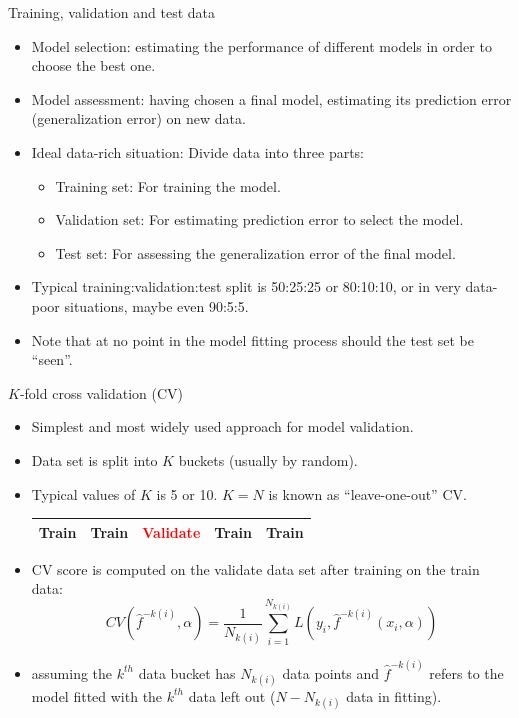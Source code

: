 \documentclass[aspectratio=169]{beamer}
\begin{document}
\begin{frame}{Training, validation and test data}
    \begin{itemize}
        \item Model selection: estimating the performance of different models in order to choose the best one.
        \item Model assessment: having chosen a final model, estimating its prediction error (generalization error) on new data.
        \item Ideal data-rich situation: Divide data into three parts:
        \begin{itemize}
            \item Training set: For training the model.
            \item Validation set: For estimating prediction error to select the model.
            \item Test set: For assessing the generalization error of the final model.
        \end{itemize}
        \item Typical training:validation:test split is 50:25:25 or 80:10:10, or in very data-poor situations, maybe even 90:5:5.
        \item Note that at no point in the model fitting process should the test set be ``seen''.
    \end{itemize}
\end{frame}


\begin{frame}{$K$-fold cross validation (CV)}
    \begin{itemize}
        \item Simplest and most widely used approach for model validation.
        \item Data set is split into $K$ buckets (usually by random).
        \item Typical values of $K$ is 5 or 10. $K = N$ is known as ``leave-one-out'' CV.
        \begin{table}
        \begin{tabular}{|p{1.7cm}|p{1.7cm}|p{1.7cm}|p{1.7cm}|p{1.7cm}|}
            \hline
            \Large{Train} & \Large{Train} & \textcolor{red}{\Large{Validate}} & \Large{Train} & \Large{Train}\\
            \hline
        \end{tabular}
        \end{table}
        \item CV score is computed on the validate data set after training on the train data:
        \begin{equation*}
                CV(\hat{f}^{-k(i)},\alpha) = \frac{1}{N_{k(i)}}\sum_{i=1}^{N_{k(i)}} L(y_i, \hat{f}^{-k(i)}(x_i,\alpha))
        \end{equation*}
        \item assuming the $k^{th}$ data bucket has $N_{k(i)}$ data points and $\hat{f}^{-k(i)}$ refers to the model fitted with the $k^{th}$ data left out ($N-N_{k(i)}$ data in fitting).
    \end{itemize}
\end{frame}
\end{document}
